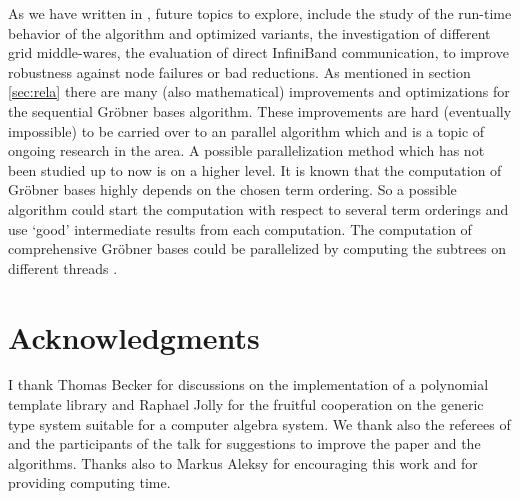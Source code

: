 \documentclass[10pt,twocolumn,a4paper]{article}
\begin{document}
As we have written in \cite{Kredel:2010}, future topics to explore,
include the study of the run-time behavior of the algorithm and
optimized variants, the investigation of different grid middle-wares,
the evaluation of direct Infini\-Band communication, to improve
robustness against node failures or bad reductions. As mentioned in
section \ref{sec:rela} there are many (also mathematical) improvements
and optimizations for the sequential Gr\"obner bases algorithm. These
improvements are hard (eventually impossible) to be carried over to an
parallel algorithm which and is a topic of ongoing research in the area.
A possible parallelization method which has not been studied up to now
is on a higher level.  It is known that the computation of Gr\"obner
bases highly depends on the chosen term ordering.  So a possible
algorithm could start the computation with respect to several term
orderings and use `good' intermediate results from each computation.
The computation of comprehensive Gr\"obner bases
could be parallelized by computing the subtrees on different threads 
\cite{Weispfenning:1992,Kredel:1992}.


\section*{Acknowledgments} 

I thank Thomas Becker for discussions on the implementation of a
polynomial template library and Raphael Jolly for the fruitful
cooperation on the generic type system suitable for a computer algebra
system.  We thank also the referees of \cite{Kredel:2009} and the
participants of the talk for suggestions to improve the paper and the
algorithms.  Thanks also to Markus Aleksy for encouraging this work and
\cite{bwgrid:2008} for providing computing time.





\end{document}
